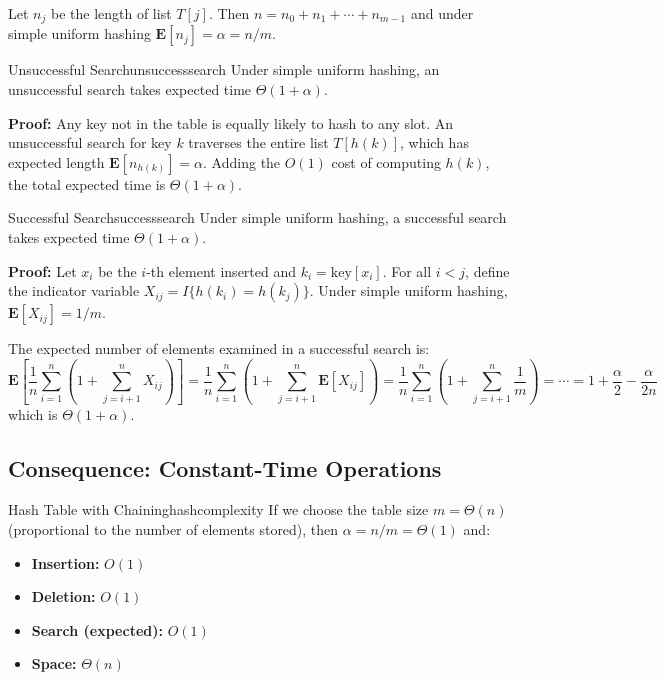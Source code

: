 Let $n_j$ be the length of list $T[j]$. Then $n = n_0 + n_1 + \cdots + n_{m-1}$ and
under simple uniform hashing $\mathbf{E}[n_j] = \alpha = n/m$.

\begin{theorem}{Unsuccessful Search}{unsuccesssearch}
Under simple uniform hashing, an unsuccessful search takes expected time $\Theta(1 + \alpha)$.

\textbf{Proof:} Any key not in the table is equally likely to hash to any slot. An
unsuccessful search for key $k$ traverses the entire list $T[h(k)]$, which has expected
length $\mathbf{E}[n_{h(k)}] = \alpha$. Adding the $O(1)$ cost of computing $h(k)$,
the total expected time is $\Theta(1 + \alpha)$.
\end{theorem}

\begin{theorem}{Successful Search}{successsearch}
Under simple uniform hashing, a successful search takes expected time $\Theta(1 + \alpha)$.

\textbf{Proof:} Let $x_i$ be the $i$-th element inserted and $k_i = \text{key}[x_i]$.
For all $i < j$, define the indicator variable $X_{ij} = I\{h(k_i) = h(k_j)\}$.
Under simple uniform hashing, $\mathbf{E}[X_{ij}] = 1/m$.

The expected number of elements examined in a successful search is:
\[
  \mathbf{E}\!\left[\frac{1}{n}\sum_{i=1}^{n}\!\left(1 + \sum_{j=i+1}^{n} X_{ij}\right)\right]
  = \frac{1}{n}\sum_{i=1}^{n}\!\left(1 + \sum_{j=i+1}^{n} \mathbf{E}[X_{ij}]\right)
  = \frac{1}{n}\sum_{i=1}^{n}\!\left(1 + \sum_{j=i+1}^{n} \frac{1}{m}\right)
  = \cdots = 1 + \frac{\alpha}{2} - \frac{\alpha}{2n}
\]
which is $\Theta(1 + \alpha)$.
\end{theorem}

\subsection{Consequence: Constant-Time Operations}

\begin{complexity}{Hash Table with Chaining}{hashcomplexity}
If we choose the table size $m = \Theta(n)$ (proportional to the number of elements stored),
then $\alpha = n/m = \Theta(1)$ and:
\begin{itemize}[noitemsep]
  \item \textbf{Insertion:} $O(1)$
  \item \textbf{Deletion:} $O(1)$
  \item \textbf{Search (expected):} $O(1)$
  \item \textbf{Space:} $\Theta(n)$
\end{itemize}
\end{complexity}

